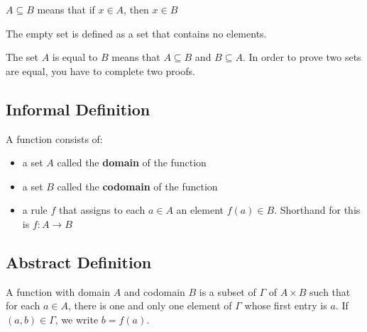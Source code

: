 $A \subseteq B$ means that if $x \in A$, then $x \in B$

The empty set is defined as a set that contains no elements.

The set $A$ is equal to $B$ means that $A \subseteq B$ and $B \subseteq A$. In order to prove two sets are equal, you have to complete two proofs.

\subsection*{\textbf{Informal Definition}}
A function consists of:
\begin{itemize}
    \item a set $A$ called the \textbf{domain} of the function
    \item a set $B$ called the \textbf{codomain} of the function
    \item a rule $f$ that assigns to each $a \in A$ an element $f(a) \in B$. Shorthand for this is $f : A \rightarrow B$
\end{itemize}
\subsection*{\textbf{Abstract Definition}}
A function with domain $A$ and codomain $B$ is a subset of $\Gamma$ of $A \times B$ such that for each $a \in A$, there is one and only one element of $\Gamma$ whose first entry is $a$. If $(a,b) \in \Gamma$, we write $b = f(a)$.
